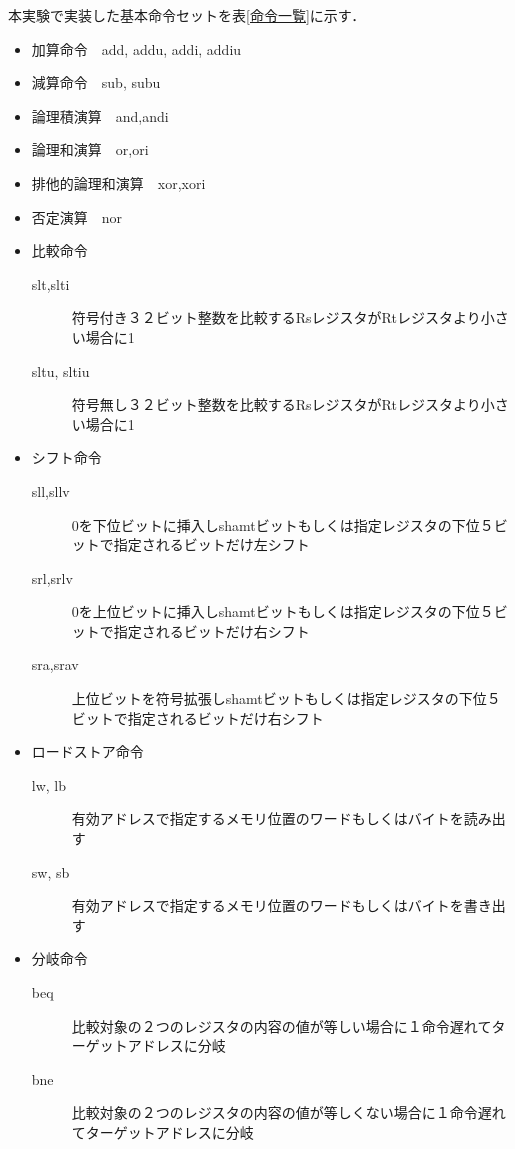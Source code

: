 \documentclass{jarticle}[11pt]
\begin{document}
本実験で実装した基本命令セットを表\ref{命令一覧}に示す．

\begin{itemize}
  \item 加算命令　add, addu, addi, addiu 
  \item 減算命令　sub, subu
  \item 論理積演算　and,andi 
  \item 論理和演算　or,ori
  \item 排他的論理和演算　xor,xori
  \item 否定演算　nor
  \item 比較命令

  \begin{description}
    \item[slt,slti] 符号付き３２ビット整数を比較するRsレジスタがRtレジスタより小さい場合に1
    \item[sltu, sltiu] 符号無し３２ビット整数を比較するRsレジスタがRtレジスタより小さい場合に1
  \end{description}

  \item シフト命令
   
  \begin{description}
    \item[sll,sllv] 0を下位ビットに挿入しshamtビットもしくは指定レジスタの下位５ビットで指定されるビットだけ左シフト
    \item[srl,srlv] 0を上位ビットに挿入しshamtビットもしくは指定レジスタの下位５ビットで指定されるビットだけ右シフト
    \item[sra,srav] 上位ビットを符号拡張しshamtビットもしくは指定レジスタの下位５ビットで指定されるビットだけ右シフト
  \end{description} 
  
  \item ロードストア命令
 
  \begin{description}
    \item[lw, lb] 有効アドレスで指定するメモリ位置のワードもしくはバイトを読み出す
    \item[sw, sb] 有効アドレスで指定するメモリ位置のワードもしくはバイトを書き出す
  \end{description} 

  \item 分岐命令

  \begin{description}
    \item[beq] 比較対象の２つのレジスタの内容の値が等しい場合に１命令遅れてターゲットアドレスに分岐
    \item[bne] 比較対象の２つのレジスタの内容の値が等しくない場合に１命令遅れてターゲットアドレスに分岐
  \end{description} 


\end{itemize}
\end{document}
